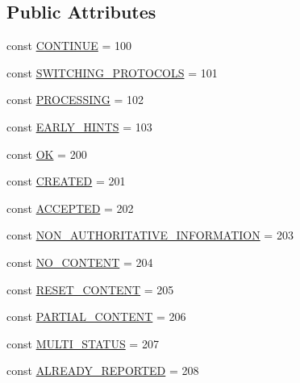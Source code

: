 \subsection*{Public Attributes}
\begin{DoxyCompactItemize}
\item 
const \hyperlink{classlibresignage_1_1api_1_1HTTPStatus_a6db3c5a7047052c473b3eb8f6d5ee024}{C\+O\+N\+T\+I\+N\+UE} = 100
\item 
const \hyperlink{classlibresignage_1_1api_1_1HTTPStatus_a5d6498cc8c0c6dff924777dc186981b8}{S\+W\+I\+T\+C\+H\+I\+N\+G\+\_\+\+P\+R\+O\+T\+O\+C\+O\+LS} = 101
\item 
const \hyperlink{classlibresignage_1_1api_1_1HTTPStatus_ad99ad564bb042453c03d26bd81221ac2}{P\+R\+O\+C\+E\+S\+S\+I\+NG} = 102
\item 
const \hyperlink{classlibresignage_1_1api_1_1HTTPStatus_a87f091aefbd9a2374e9b53da95450e09}{E\+A\+R\+L\+Y\+\_\+\+H\+I\+N\+TS} = 103
\item 
const \hyperlink{classlibresignage_1_1api_1_1HTTPStatus_a57a5c6d82b65e68f390d89f01cbb784a}{OK} = 200
\item 
const \hyperlink{classlibresignage_1_1api_1_1HTTPStatus_ad7bd4c41017eab42e891cd9490b9b73c}{C\+R\+E\+A\+T\+ED} = 201
\item 
const \hyperlink{classlibresignage_1_1api_1_1HTTPStatus_a6790d726571e119c3c0d9ce63a34c1fd}{A\+C\+C\+E\+P\+T\+ED} = 202
\item 
const \hyperlink{classlibresignage_1_1api_1_1HTTPStatus_a8c0e7b77c2662bbebd6e4f4f8bf6cfec}{N\+O\+N\+\_\+\+A\+U\+T\+H\+O\+R\+I\+T\+A\+T\+I\+V\+E\+\_\+\+I\+N\+F\+O\+R\+M\+A\+T\+I\+ON} = 203
\item 
const \hyperlink{classlibresignage_1_1api_1_1HTTPStatus_aac452b2950b08c0badc53fb99e15816b}{N\+O\+\_\+\+C\+O\+N\+T\+E\+NT} = 204
\item 
const \hyperlink{classlibresignage_1_1api_1_1HTTPStatus_a9e5b547ed77859872b1b7a58093b14e9}{R\+E\+S\+E\+T\+\_\+\+C\+O\+N\+T\+E\+NT} = 205
\item 
const \hyperlink{classlibresignage_1_1api_1_1HTTPStatus_a71fd2e4f2eca29eea364395a90041172}{P\+A\+R\+T\+I\+A\+L\+\_\+\+C\+O\+N\+T\+E\+NT} = 206
\item 
const \hyperlink{classlibresignage_1_1api_1_1HTTPStatus_a791cf963e3fc7674ce3e31581864b899}{M\+U\+L\+T\+I\+\_\+\+S\+T\+A\+T\+US} = 207
\item 
const \hyperlink{classlibresignage_1_1api_1_1HTTPStatus_a557354b7aa40e194f87805c648f77c68}{A\+L\+R\+E\+A\+D\+Y\+\_\+\+R\+E\+P\+O\+R\+T\+ED} = 208

\end{DoxyCompactItemize}
